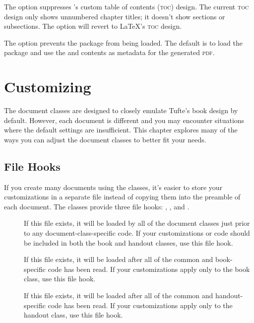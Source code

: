 The  option suppresses \TL's custom table of contents
(\textsc{toc}) design.  The current \textsc{toc} design only shows unnumbered
chapter titles; it doesn't show sections or subsections.  The 
option will revert to \LaTeX's \textsc{toc} design.

The  option prevents the  package from
being loaded.  The default is to load the  package and use the
 and  contents as metadata for the generated
\textsc{pdf}.




\chapter[Customizing Tufte-LaTeX]{Customizing \TL}
\label{ch:customizing}

The \TL document classes are designed to closely emulate Tufte's book
design by default.  However, each document is different and you may encounter
situations where the default settings are insufficient.  This chapter explores
many of the ways you can adjust the \TL document classes to better fit
your needs.

\section{File Hooks}
\label{sec:filehooks}

If you create many documents using the \TL classes, it's easier to
store your customizations in a separate file instead of copying them into the
preamble of each document.  The \TL classes provide three file hooks:
, , and
.\sloppy

\begin{description}
  \item[]
    If this file exists, it will be loaded by all of the \TL document
    classes just prior to any document-class-specific code.  If your
    customizations or code should be included in both the book and handout
    classes, use this file hook.
  \item[] 
    If this file exists, it will be loaded after all of the common and
    book-specific code has been read.  If your customizations apply only to the
    book class, use this file hook.
  \item[] 
    If this file exists, it will be loaded after all of the common and
    handout-specific code has been read.  If your customizations apply only to
    the handout class, use this file hook.
\end{description}

